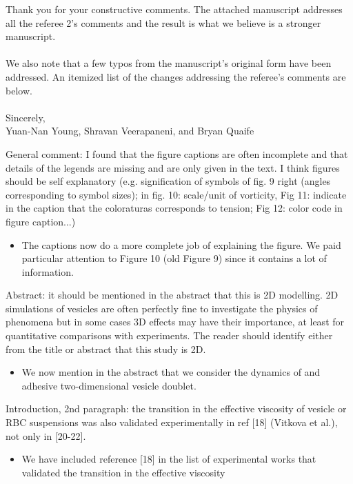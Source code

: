 \documentclass[11pt]{article}
\newcommand{\comment}[1]{{\color{blue} #1}}
\begin{document}
\noindent
Thank you for your constructive comments.  The attached manuscript
addresses all the referee 2's comments and the result is what we
believe is a stronger manuscript.
\\ \\ \noindent 
We also note that a few typos from the manuscript’s original form have
been addressed. An itemized list of the changes addressing the referee's
comments are below.
\\ \\ \noindent 
Sincerely, \\ \noindent
Yuan-Nan Young, Shravan Veerapaneni, and Bryan Quaife

\vspace{20pt}
\noindent
\comment{General comment: I found that the figure captions are often
incomplete and that details of the legends are missing and are only
given in the text. I think figures should be self explanatory (e.g.
signification of symbols of fig. 9 right (angles corresponding to symbol
sizes); in fig. 10: scale/unit of vorticity, Fig 11: indicate in the
caption that the coloraturas corresponds to tension; Fig 12: color code
in figure caption...)}
\begin{itemize}
  \item The captions now do a more complete job of explaining the
    figure.  We paid particular attention to Figure 10 (old Figure 9)
    since it contains a lot of information.
\end{itemize}

\noindent
\comment{Abstract: it should be mentioned in the abstract that this is
2D modelling. 2D simulations of vesicles are often perfectly fine to
investigate the physics of phenomena but in some cases 3D effects may
have their importance, at least for quantitative comparisons with
experiments. The reader should identify either from the title or
abstract that this study is 2D.}
\begin{itemize}
  \item We now mention in the abstract that we consider the dynamics of
    and adhesive two-dimensional vesicle doublet.
\end{itemize}

\noindent
\comment{Introduction, 2nd paragraph: the transition in the effective
viscosity of vesicle or RBC suspensions was also validated
experimentally in ref [18] (Vitkova et al.), not only in [20-22].}
\begin{itemize}
  \item We have included reference [18] in the list of experimental
    works that validated the transition in the effective viscosity
\end{itemize}
\end{document}
